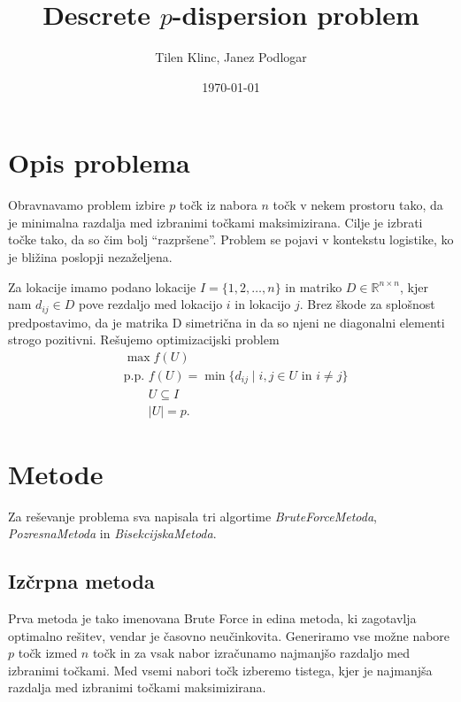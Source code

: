 \documentclass[a4paper]{article}
\title{Descrete $p$-dispersion problem}
\author{Tilen Klinc, Janez Podlogar}
\date{\today}
\begin{document}
\maketitle

\section{Opis problema}

Obravnavamo problem izbire $ p $ točk iz nabora $ n $ točk v nekem prostoru
tako, da je minimalna razdalja med izbranimi točkami maksimizirana. Cilje je
izbrati točke tako, da so čim bolj ``razpršene''. Problem se pojavi v kontekstu
logistike, ko je bližina poslopji nezaželjena.


Za lokacije imamo podano lokacije $ I = \{ 1, 2, \ldots, n \} $ in matriko $ D \in 
\mathbb{R}^{n \times n} $, kjer nam $ d_{ij} \in D $ pove rezdaljo med lokacijo $ i $
in lokacijo $ j $. Brez škode za splošnost predpostavimo, da je matrika D simetrična in
da so njeni ne diagonalni elementi strogo pozitivni. Rešujemo optimizacijski problem
\begin{align*}
    & \max f(U) \\
    & \text{p.p. } f(U) = \min \{ d_{ij} \mid i,j \in U \text{ in } i \neq j \} \\
    & \qquad U \subseteq I \\
    & \qquad |U| = p .
\end{align*}

\section{Metode}

Za reševanje problema sva napisala tri algortime \textit{BruteForceMetoda}, \textit{PozresnaMetoda}
in \textit{BisekcijskaMetoda}.

\subsection{Izčrpna metoda}

Prva metoda je tako imenovana Brute Force in edina metoda, ki zagotavlja optimalno rešitev,
vendar je časovno neučinkovita. Generiramo vse možne nabore $ p $ točk izmed $ n $ točk in za vsak nabor
izračunamo najmanjšo razdaljo med izbranimi točkami. Med vsemi nabori točk izberemo
tistega, kjer je najmanjša razdalja med izbranimi točkami maksimizirana.
\end{document}
